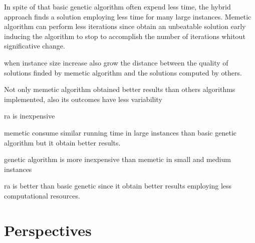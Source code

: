 In spite of that basic genetic algorithm often expend less time, the hybrid approach finds a solution employing less time for many large instances. Memetic algorithm can perform less iterations since obtain an unbeatable solution early inducing the algorithm to stop to accomplish the number of iterations whitout significative change. %


when instance size increase also grow the distance between the quality of solutions finded by memetic algorithm and the solutions computed by others.

Not only memetic algorithm obtained better results than others algorithms implemented, also its outcomes have less variability

ra is inexpensive

memetic consume similar running time in large instances than basic genetic algorithm but it obtain better results.

genetic algorithm is more inexpensive than memetic in small and medium instances

ra is better than basic genetic since it obtain better results employing less computational resources.




\section*{Perspectives}
